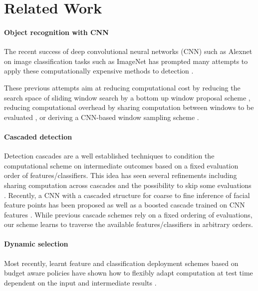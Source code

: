 \section{Related Work}\label{sec:related}

\paragraph{Object recognition with CNN}\label{object-recognition-with-cnn}

The recent success of deep convolutional neural networks (CNN) such as Alexnet \cite{Krizhevsky-NIPS-2012} on image classification tasks such as ImageNet \cite{Deng-CVPR-2009} has prompted many attempts to apply these computationally expensive methods to detection \cite{Girshick-CVPR-2014,Zou-BMVC-2014,Simonyan-ICLR-2014,Erhan-CVPR-2014,Sermanet-ICLR-2014} .

These previous attempts aim at reducing computational cost by reducing the search space of sliding window search by a bottom up window proposal scheme \cite{Girshick-CVPR-2014}, reducing computational overhead by sharing computation between windows to be evaluated \cite{Zou-BMVC-2014,Sermanet-ICLR-2014}, or deriving a CNN-based window sampling scheme \cite{Simonyan-ICLR-2014}.

\paragraph{Cascaded detection}\label{cascaded-detection}
Detection cascades \cite{Viola-IJCV-2004,Felzenszwalb-CVPR-2010} are a well established techniques to condition the computational scheme on intermediate outcomes based on a fixed evaluation order of features/classifiers.
This idea has seen several refinements including sharing computation across cascades \cite{Dollar-ECCV-2012} and the possibility to skip some evaluations \cite{Benbouzid-ICML-2012}.
Recently, a CNN with a cascaded structure for coarse to fine inference of facial feature points has been proposed \cite{Sun-CVPR-2013} as well as a boosted cascade trained on CNN features \cite{Zou-BMVC-2014}. While previous cascade schemes rely on a fixed ordering of evaluations, our scheme learns to traverse the available features/classifiers in arbitrary orders.

\paragraph{Dynamic selection}\label{dynamic-selection}
Most recently, learnt feature and classification deployment schemes based on budget aware policies have shown how to flexibly adapt computation at test time dependent on the input and intermediate results \cite{Karayev-NIPS-2012,DulacArnold-ICLR-2014}.
